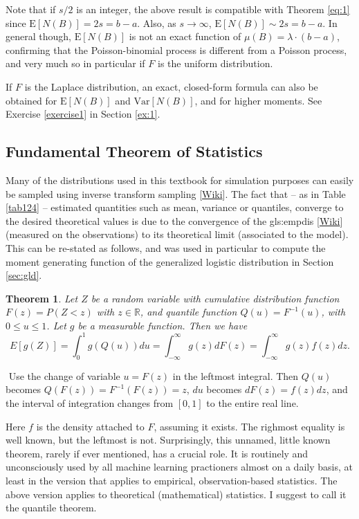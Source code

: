 \documentclass[10pt]{article}
\newtheorem{theorem}{Theorem}[section]
\newenvironment{proof}[1][Proof]{\begin{trivlist}
\item[\hskip \labelsep {\bfseries #1}]}{\end{trivlist}}
\newcommand{\qed}{\nobreak \ifvmode \relax \else
      \ifdim\lastskip<1.5em \hskip-\lastskip
      \hskip1.5em plus0em minus0.5em \fi \nobreak
      \vrule height0.75em width0.5em depth0.25em\fi}
\begin{document}
Note that if $s/2$ is an integer, the above result is compatible with Theorem \ref{eq:1} since $\mbox{E}[N(B)]=2s = b-a$. Also, as $s\rightarrow\infty$, $\mbox{E}[N(B)]\sim 2s=b-a$. In general though, $\mbox{E}[N(B)]$ is not an exact function of $\mu(B)=\lambda\cdot (b-a)$, confirming that the Poisson-binomial process is different from a Poisson process, and very much so in particular if $F$ is the uniform distribution.

If $F$ is the \textcolor{index}{Laplace distribution}, an exact, closed-form formula can also be obtained for $\mbox{E}[N(B)]$ and $\mbox{Var}[N(B)]$, and for higher moments. 
See Exercise \ref{exercise1} in Section \ref{ex:1}.

\subsection{Fundamental Theorem of Statistics}

Many of the distributions used in this textbook for simulation purposes can easily be sampled using \textcolor{index}{inverse transform sampling} [\href{https://en.wikipedia.org/wiki/Inverse_transform_sampling}{Wiki}]. The fact that -- as in Table \ref{tab124} -- estimated quantities such as mean, variance or quantiles, converge to the desired theoretical values is due to the convergence of the  \gls{gls:empdis} [\href{https://en.wikipedia.org/wiki/Empirical_distribution_function}{Wiki}] 
 (measured on the observations) to its theoretical limit (associated to the model). This can be re-stated as follows, and was used in particular to compute the moment generating function of the generalized logistic distribution in Section \ref{sec:gld}.

\begin{theorem}
\label{sums7}
Let $Z$ be a random variable with cumulative distribution function $F(z)=P(Z<z)$ with $z\in\mathbb{R}$, and quantile function $Q(u)=F^{-1}(u)$, with $0\leq u \leq 1$. Let $g$ be a measurable function. Then we have
$$E[g(Z)] = \int_0^1 g(Q(u))du=\int_{-\infty}^{\infty}g(z)dF(z)=\int_{-\infty}^{\infty}g(z)f(z)dz.$$
 \end{theorem}
\begin{proof}
$ $ \newline
Use the change of variable $u=F(z)$ in the leftmost integral. Then $Q(u)$ becomes $Q(F(z))=F^{-1}(F(z))=z$, $du$ becomes $dF(z)=f(z)dz$, and the interval of integration changes from $[0, 1]$ to the entire real line. \qed
\end{proof}
Here $f$ is the density attached to $F$, assuming it exists. The righmost equality is well known, but the leftmost is not. Surprisingly, this unnamed, little known theorem, rarely if ever mentioned, has a crucial role. It is routinely and unconsciously used by all machine learning practioners almost on a daily basis, at least in the version that applies to empirical, observation-based statistics. The above version applies to theoretical (mathematical) statistics. I suggest to call it the \textcolor{index}{quantile theorem}. 
\end{document}
